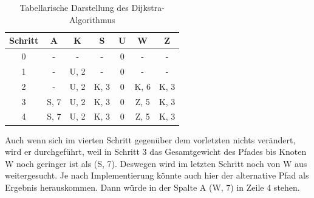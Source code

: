 \documentclass[12pt]{amsart}
\begin{document}
\begin{table}[h]
   \centering
   \begin{tabular}{@{} |c | c | c | c | c | c | c |@{}} %
      \toprule
      Schritt    & A & K & S & U & W & Z\\
      \midrule
      0 & - & - & - & 0 & - & - \\
      1 & - & U, 2 & - & 0 & - & - \\
      2 & - & U, 2 & K, 3 & 0 & K, 6 & K, 3 \\
      3 & S, 7 & U, 2 & K, 3 & 0 & Z, 5 & K, 3 \\
      4 & S, 7 & U, 2 & K, 3 & 0 & Z, 5 & K, 3 \\
      \bottomrule
   \end{tabular}
   \caption{Tabellarische Darstellung des Dijkstra-Algorithmus}
   \label{tab:booktabs}
\end{table}

Auch wenn sich im vierten Schritt gegenüber dem vorletzten nichts verändert, wird er durchgeführt, weil in Schritt 3 das Gesamtgewicht des Pfades bis Knoten W noch geringer ist als (S, 7). Deswegen wird im letzten Schritt noch von W aus weitergesucht. Je nach Implementierung könnte auch hier der alternative Pfad als Ergebnis herauskommen. Dann würde in der Spalte A (W, 7) in Zeile 4 stehen.
\end{document}
